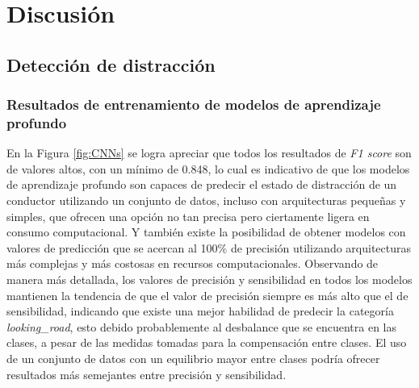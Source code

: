%
\chapter{Discusión}
\label{sec::capitulo5}

\section{Detección de distracción}
\subsection{Resultados de entrenamiento de modelos de aprendizaje profundo}
En la Figura \ref{fig:CNNs} se logra apreciar que todos los resultados de \textit{F1 score} son de valores altos, con un mínimo de 0.848, lo cual es indicativo de que los modelos de aprendizaje profundo son capaces de predecir el estado de distracción de un conductor utilizando un conjunto de datos, incluso con arquitecturas pequeñas y simples, que ofrecen una opción no tan precisa pero ciertamente ligera en consumo computacional. Y también existe la posibilidad de obtener modelos con valores de predicción que se acercan al 100\% de precisión utilizando arquitecturas más complejas y más costosas en recursos computacionales. Observando de manera más detallada, los valores de precisión y sensibilidad en todos los modelos mantienen la tendencia de que el valor de precisión siempre es más alto que el de sensibilidad, indicando que existe una mejor habilidad de predecir la categoría \textit{looking\_road}, esto debido probablemente al desbalance que se encuentra en las clases, a pesar de las medidas tomadas para la compensación entre clases. El uso de un conjunto de datos con un equilibrio mayor entre clases podría ofrecer resultados más semejantes entre precisión y sensibilidad. 


